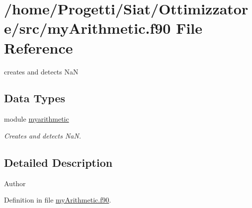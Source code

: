 \hypertarget{my_arithmetic_8f90}{\section{/home/\-Progetti/\-Siat/\-Ottimizzatore/src/my\-Arithmetic.f90 File Reference}
\label{my_arithmetic_8f90}
}


creates and detects Na\-N  


\subsection*{Data Types}
\begin{DoxyCompactItemize}
\item 
module \hyperlink{classmyarithmetic}{myarithmetic}
\begin{DoxyCompactList}\small\item\em Creates and detects Na\-N. \end{DoxyCompactList}\end{DoxyCompactItemize}


\subsection{Detailed Description}
\begin{DoxyAuthor}{Author}

\end{DoxyAuthor}


Definition in file \hyperlink{my_arithmetic_8f90_source}{my\-Arithmetic.\-f90}.

